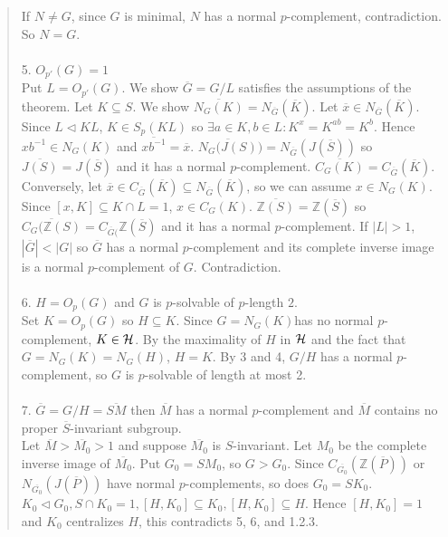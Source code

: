 \begin{quote}
If $N \neq G$, since $G$ is minimal,
$N$ has a normal $p$-complement, contradiction.  So $N = G$.
\\
\\
5. $O_{p'}(G) = 1$
\\
Put $L = O_{p'}(G)$.  We show ${\overline G} = G/L$ satisfies the assumptions of the theorem.
Let $K \subseteq S$.  We show ${\overline {N_G(K)}} = N_{\overline G}({\overline K})$.  Let
${\overline x} \in N_{\overline G}({\overline K})$.  Since $L \lhd KL$, $K \in S_p(KL)$ so
$\exists a \in K, b \in L: K^x = K^{ab}= K^b$.
Hence $xb^{-1} \in N_G(K)$ and ${\overline {xb^{-1}}}= {\overline x}$.
${\overline {N_G(J(S)})} = N_{\overline G}(J({\overline S}))$ so 
${\overline {J(S)}} = J({\overline S})$
and it has a normal $p$-complement.
${\overline {C_G(K)}} = C_{\overline G}({\overline K})$.  Conversely, let
${\overline x} \in C_{\overline G}({\overline K}) \subseteq N_{\overline G}({\overline K})$,
so we can assume $x \in N_G(K)$. Since $[x, K] \subseteq  K \cap L = 1$, $x \in C_G(K)$.
${\overline {{\mathbb Z}(S)}} = {\mathbb Z}({\overline S})$ so
${\overline {C_G({\mathbb Z}(S)}} = C_{\overline G(}{\mathbb Z}({\overline S})$
and it has a normal $p$-complement.
If $|L| > 1$, $|{\overline G}| < |G|$ so ${\overline G}$ has a normal $p$-complement
and its complete inverse image is a normal $p$-complement of $G$.  Contradiction.
\\
\\
6. $H = O_p(G)$ and $G$ is $p$-solvable of $p$-length $2$.
\\
Set $K = O_p(G)$ so $H \subseteq K$.  Since $G = N_G(K)$has no normal $p$-complement,
$K \in {\cal H}$.  By the
maximality of $H$ in ${\cal H}$ and the fact that $G=N_G(K)= N_G(H)$, $H=K$.
By 3 and 4, $G/H$ has a normal $p$-complement, so $G$ is $p$-solvable of length at most 2.
\\
\\
7.  ${\overline G} = G/H = {\overline {SM}}$ then ${\overline M}$ has a normal $p$-complement and
${\overline M}$ contains no proper ${\overline S}$-invariant subgroup.
\\
Let ${\overline M} > {\overline {M_0}} > 1$ and suppose ${\overline {M_0}}$ is
$S$-invariant.  Let $M_0$ be the complete inverse image of ${\overline {M_0}}$.  Put $G_0 = S M_0$,
so $G > G_0$.
Since
$C_{\overline {G_0}}({\mathbb Z}({\overline P}))$ or 
$N_{\overline {G_0}}(J({\overline P}))$ have normal $p$-complements,
so does $G_0 = S K_0$.  $K_0 \lhd G_0, S \cap K_0 = 1, [H, K_0] \subseteq K_0, [H, K_0] \subseteq H$.  Hence
$[H, K_0] = 1$ and $K_0$ centralizes $H$, this contradicts 5, 6, and 1.2.3.

\end{quote}

